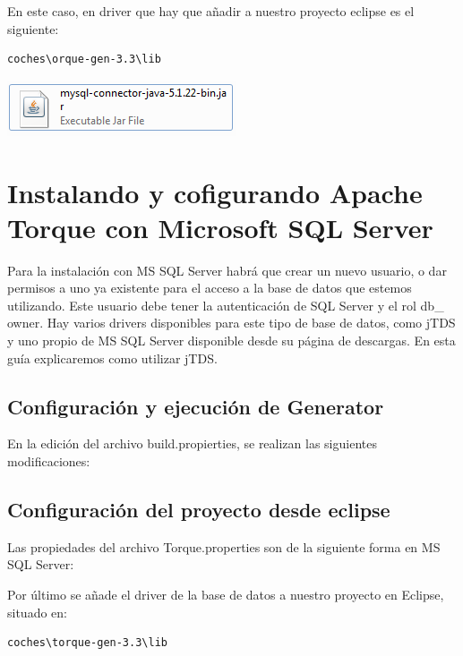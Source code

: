 \documentclass[12pt, oneside]{article}
\begin{document}


En este caso, en driver que hay que añadir a nuestro proyecto eclipse es el siguiente:
\begin{lstlisting}
coches\orque-gen-3.3\lib
\end{lstlisting}

\begin{center}
	\includegraphics{img/mysql-file.png}
\end{center}

\section{Instalando y cofigurando Apache Torque con Microsoft SQL Server}
Para la instalación con MS SQL Server habrá que crear un nuevo usuario, o dar permisos a uno ya existente para el acceso a la base de datos que estemos utilizando. Este usuario debe tener la autenticación de SQL Server y el rol db\_ owner. Hay varios drivers disponibles para este tipo de base de datos, como jTDS y uno propio de MS SQL Server disponible desde su página de descargas. En esta guía explicaremos como utilizar jTDS.

\subsection{Configuración y ejecución de Generator}
En la edición del archivo build.propierties, se realizan las siguientes modificaciones:



\subsection{Configuración del proyecto desde eclipse}
Las propiedades del archivo Torque.properties son de la siguiente forma en MS SQL Server:


Por último se añade el driver de la base de datos a nuestro proyecto en Eclipse, situado en:
\begin{lstlisting}
coches\torque-gen-3.3\lib
\end{lstlisting}

\end{document}
